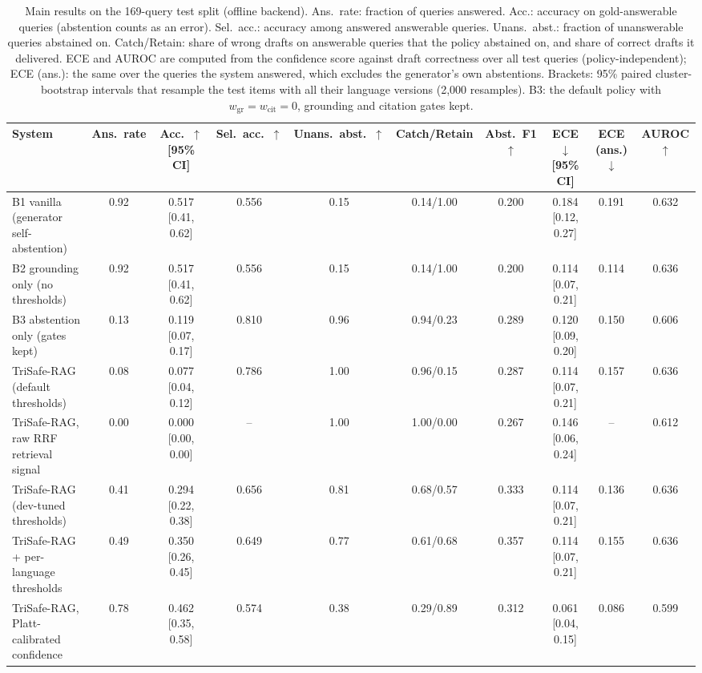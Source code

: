 \begin{table}[t]
  \caption{Main results on the 169-query test split (offline backend). Ans.\ rate: fraction of queries answered. Acc.: accuracy on gold-answerable queries (abstention counts as an error). Sel.\ acc.: accuracy among answered answerable queries. Unans.\ abst.: fraction of unanswerable queries abstained on. Catch/Retain: share of wrong drafts on answerable queries that the policy abstained on, and share of correct drafts it delivered. ECE and AUROC are computed from the confidence score against draft correctness over all test queries (policy-independent); ECE (ans.): the same over the queries the system answered, which excludes the generator's own abstentions. Brackets: 95\% paired cluster-bootstrap intervals that resample the test items with all their language versions (2{,}000 resamples). B3: the default policy with $w_{\mathrm{gr}}{=}w_{\mathrm{cit}}{=}0$, grounding and citation gates kept.}
  \label{tab:main-offline}
  \footnotesize
  \setlength{\tabcolsep}{2.5pt}
  \begin{tabular}{@{}lccccccccc@{}}
    \toprule
    System & Ans.\ rate & Acc.\ $\uparrow$ [95\% CI] & Sel.\ acc.\ $\uparrow$ & Unans.\ abst.\ $\uparrow$ & Catch/Retain & Abst.\ F1 $\uparrow$ & ECE $\downarrow$ [95\% CI] & ECE (ans.) $\downarrow$ & AUROC $\uparrow$ \\
    \midrule
    B1 vanilla (generator self-abstention) & 0.92 & 0.517 [0.41, 0.62] & 0.556 & 0.15 & 0.14/1.00 & 0.200 & 0.184 [0.12, 0.27] & 0.191 & 0.632 \\
    B2 grounding only (no thresholds) & 0.92 & 0.517 [0.41, 0.62] & 0.556 & 0.15 & 0.14/1.00 & 0.200 & 0.114 [0.07, 0.21] & 0.114 & 0.636 \\
    B3 abstention only (gates kept) & 0.13 & 0.119 [0.07, 0.17] & 0.810 & 0.96 & 0.94/0.23 & 0.289 & 0.120 [0.09, 0.20] & 0.150 & 0.606 \\
    TriSafe-RAG (default thresholds) & 0.08 & 0.077 [0.04, 0.12] & 0.786 & 1.00 & 0.96/0.15 & 0.287 & 0.114 [0.07, 0.21] & 0.157 & 0.636 \\
    TriSafe-RAG, raw RRF retrieval signal & 0.00 & 0.000 [0.00, 0.00] & -- & 1.00 & 1.00/0.00 & 0.267 & 0.146 [0.06, 0.24] & -- & 0.612 \\
    TriSafe-RAG (dev-tuned thresholds) & 0.41 & 0.294 [0.22, 0.38] & 0.656 & 0.81 & 0.68/0.57 & 0.333 & 0.114 [0.07, 0.21] & 0.136 & 0.636 \\
    TriSafe-RAG + per-language thresholds & 0.49 & 0.350 [0.26, 0.45] & 0.649 & 0.77 & 0.61/0.68 & 0.357 & 0.114 [0.07, 0.21] & 0.155 & 0.636 \\
    TriSafe-RAG, Platt-calibrated confidence & 0.78 & 0.462 [0.35, 0.58] & 0.574 & 0.38 & 0.29/0.89 & 0.312 & 0.061 [0.04, 0.15] & 0.086 & 0.599 \\
    \bottomrule
  \end{tabular}
\end{table}
